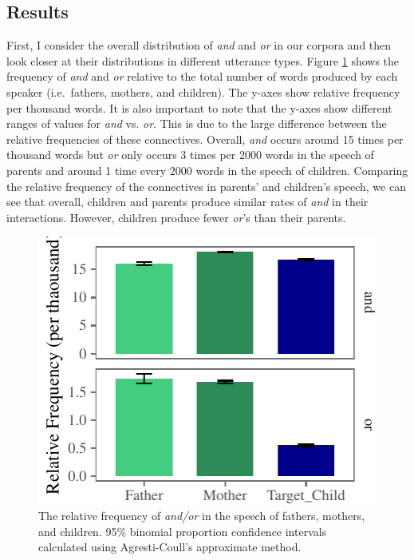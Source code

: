 \documentclass[oneside]{report}
\theoremstyle{definition}
\theoremstyle{definition}
\theoremstyle{definition}
\theoremstyle{remark}
\begin{document}
\subsection{Results}\label{study1results}

First, I consider the overall distribution of \emph{and} and \emph{or}
in our corpora and then look closer at their distributions in different
utterance types. Figure \ref{fig:freqTableBySpeakerPlot} shows the
frequency of \emph{and} and \emph{or} relative to the total number of
words produced by each speaker (i.e.~fathers, mothers, and children).
The y-axes show relative frequency per thousand words. It is also
important to note that the y-axes show different ranges of values for
\emph{and} vs. \emph{or}. This is due to the large difference between
the relative frequencies of these connectives. Overall, \emph{and}
occurs around 15 times per thousand words but \emph{or} only occurs 3
times per 2000 words in the speech of parents and around 1 time every
2000 words in the speech of children. Comparing the relative frequency
of the connectives in parents' and children's speech, we can see that
overall, children and parents produce similar rates of \emph{and} in
their interactions. However, children produce fewer \emph{or}'s than
their parents.
\begin{figure}[tb]

{\centering \includegraphics{figs/freqTableBySpeakerPlot-1} 

}

\caption{The relative frequency of \textit{and/or} in the speech of fathers, mothers, and children. 95\% binomial proportion confidence intervals calculated using Agresti-Coull's approximate method.}\label{fig:freqTableBySpeakerPlot}
\end{figure}
\end{document}
